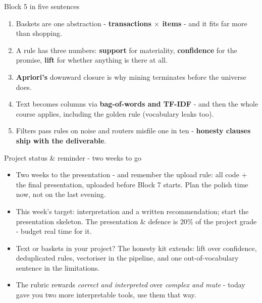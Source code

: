 \documentclass[10pt,aspectratio=169]{beamer}
\begin{document}
\begin{frame}{Block 5 in five sentences}
  \begin{enumerate}
    \item Baskets are one abstraction - \textbf{transactions $\times$
          items} - and it fits far more than shopping.
    \item A rule has three numbers: \textbf{support} for materiality,
          \textbf{confidence} for the promise, \textbf{lift} for whether
          anything is there at all.
    \item \textbf{Apriori's} downward closure is why mining terminates
          before the universe does.
    \item Text becomes columns via \textbf{bag-of-words and TF-IDF} -
          and then the whole course applies, including the golden rule
          (vocabulary leaks too).
    \item Filters pass rules on noise and routers misfile one in ten -
          \textbf{honesty clauses ship with the deliverable}.
  \end{enumerate}
\end{frame}

\begin{frame}{Project status \& reminder - two weeks to go}
  \begin{itemize}
    \item Two weeks to the presentation - and remember the upload rule:
          \alert{all code + the final presentation, uploaded before Block 7
          starts}. Plan the polish time now, not on the last evening.
    \item This week's target: interpretation and a written recommendation;
          start the presentation skeleton. The presentation \& defence is
          \alert{20\% of the project grade} - budget real time for it.
    \item Text or baskets in your project? The honesty kit extends:
          lift over confidence, deduplicated rules, vectoriser in the
          pipeline, and one out-of-vocabulary sentence in the limitations.
    \item The rubric rewards \emph{correct and interpreted} over
          \emph{complex and mute} - today gave you two more interpretable
          tools, use them that way.
  \end{itemize}
\end{frame}
\end{document}
